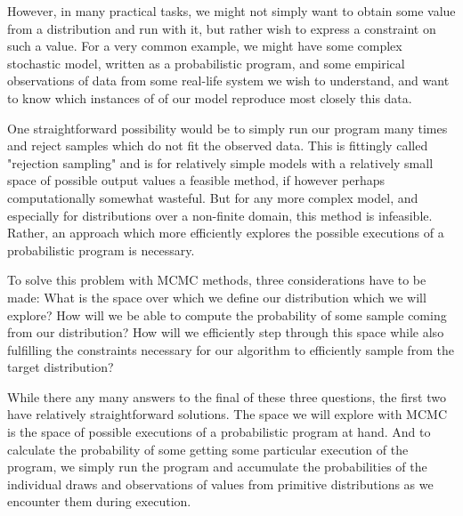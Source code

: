 However, in many practical tasks, we might not simply want to obtain some value from a distribution and run with it, but rather wish to express a constraint on such a value. For a very common example, we might have some complex stochastic model, written as a probabilistic program, and some empirical observations of data from some real-life system we wish to understand, and want to know which instances of of our model reproduce most closely this data.

One straightforward possibility would be to simply run our program many times and reject samples which do not fit the observed data. This is fittingly called "rejection sampling" and is for relatively simple models with a relatively small space of possible output values a feasible method, if however perhaps computationally somewhat wasteful. But for any more complex model, and especially for distributions over a non-finite domain, this method is infeasible. Rather, an approach which more efficiently explores the possible executions of a probabilistic program is necessary.

To solve this problem with MCMC methods, three considerations have to be made: What is the space over which we define our distribution which we will explore? How will we be able to compute the probability of some sample coming from our distribution? How will we efficiently step through this space while also fulfilling the constraints necessary for our algorithm to efficiently sample from the target distribution?

While there any many answers to the final of these three questions, the first two have relatively straightforward solutions. The space we will explore with MCMC is the space of possible executions of a probabilistic program at hand. And to calculate the probability of some getting some particular execution of the program, we simply run the program and accumulate the probabilities of the individual draws and observations of values from primitive distributions as we encounter them during execution.
